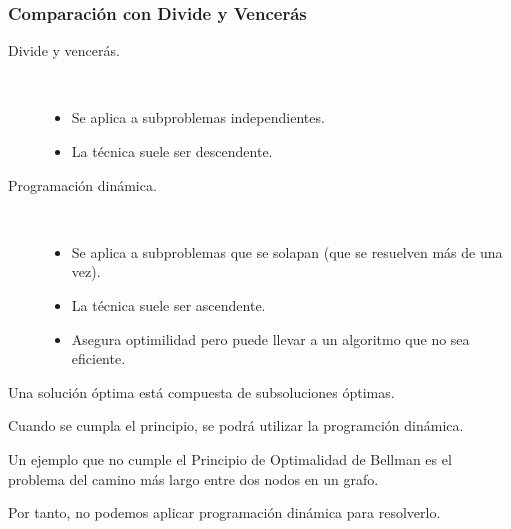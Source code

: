\subsubsection{Comparación con Divide y Vencerás}
\begin{description}
    \item [Divide y vencerás.] \
        \begin{itemize}
            \item Se aplica a subproblemas independientes.
            \item La técnica suele ser descendente.
        \end{itemize}
    \item [Programación dinámica.]  \
        \begin{itemize}
            \item Se aplica a subproblemas que se solapan (que se resuelven más de una vez).
            \item La técnica suele ser ascendente.
            \item Asegura optimilidad pero puede llevar a un algoritmo que no sea eficiente.
        \end{itemize}
\end{description}

\begin{teo}\label{principio_optimalidad}
    Una solución óptima está compuesta de subsoluciones óptimas.
\end{teo}
Cuando se cumpla el principio, se podrá utilizar la programción dinámica.
\begin{ejemplo}
    Un ejemplo que no cumple el Principio de Optimalidad de Bellman es el problema del camino más largo entre dos nodos en un grafo. 

    Por tanto, no podemos aplicar programación dinámica para resolverlo.
\end{ejemplo}

